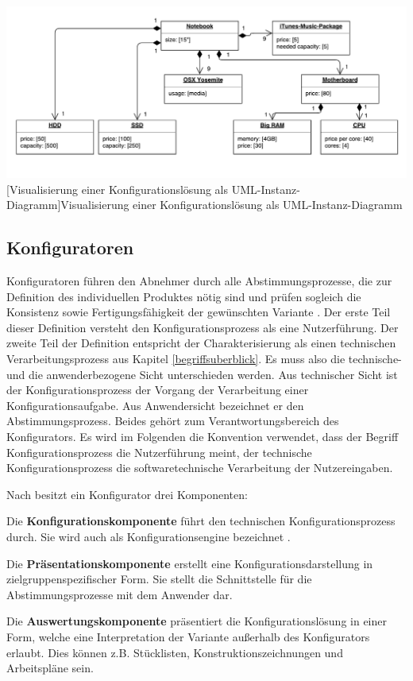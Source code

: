 \documentclass[11pt, a4paper, titlepage, listof=totoc, bibliography=totoc, index=totoc, twoside, openright, headings=normal, draft]{scrreprt}
\begin{document}
\vspace{1em}
\begin{minipage}{\linewidth}
	\centering
	\includegraphics[width=1\linewidth]{Abbildungen/notebookInstanceUML.pdf}
	[Visualisierung einer Konfigurationslösung als UML-Instanz-Diagramm]{Visualisierung einer Konfigurationslösung als UML-Instanz-Diagramm}
	\label{fig:notebookInstanceUML}
\end{minipage}
\vspace{1em}

\subsection{Konfiguratoren}
\label{Konfigurationssysteme}
Konfiguratoren \glqq [...] führen den Abnehmer durch alle Abstimmungsprozesse, die zur Definition des individuellen Produktes nötig sind und prüfen sogleich die Konsistenz sowie Fertigungsfähigkeit der gewünschten Variante\grqq{} \citep{piller06}. Der erste Teil dieser Definition versteht den Konfigurationsprozess als eine Nutzerführung. Der zweite Teil der Definition entspricht der Charakterisierung als einen technischen Verarbeitungsprozess aus Kapitel \ref{begriffsuberblick}. Es muss also die technische- und die anwenderbezogene Sicht unterschieden werden. Aus technischer Sicht ist der Konfigurationsprozess der Vorgang der Verarbeitung einer Konfigurationsaufgabe. Aus Anwendersicht bezeichnet er den Abstimmungsprozess. Beides gehört zum Verantwortungsbereich des Konfigurators. Es wird im Folgenden die Konvention verwendet, dass der Begriff \glqq Konfigurationsprozess\grqq{} die Nutzerführung meint, der \glqq technische Konfigurationsprozess\grqq{} die softwaretechnische Verarbeitung der Nutzereingaben.

Nach \citet{piller06} besitzt ein Konfigurator drei Komponenten:
\begin{compactitem}
\item Die \textbf{Konfigurationskomponente} führt den technischen Konfigurationsprozess durch. Sie wird auch als Konfigurationsengine bezeichnet \citep{tactonProductOverview}.
\item Die \textbf{Präsentationskomponente} erstellt eine Konfigurationsdarstellung in zielgruppenspezifischer Form. Sie stellt die Schnittstelle für die Abstimmungsprozesse mit dem Anwender dar.
\item Die \textbf{Auswertungskomponente} präsentiert die Konfigurationslösung in einer Form, welche eine Interpretation der Variante außerhalb des Konfigurators erlaubt. Dies können z.B. Stücklisten, Konstruktionszeichnungen und Arbeitspläne sein.
\end{compactitem}
\end{document}

